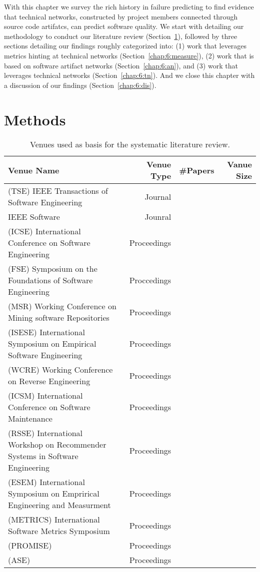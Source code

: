 \label{chap:tech-net}
With this chapter we survey the rich history in failure predicting to find evidence that technical networks, constructed by project members connected through source code artifatcs, can predict software quality.
We start with detailing our methodology to conduct our literature review (Section~\ref{chap:6:methods}), followed by three sections detailing our findings roughly categorized into: 
(1) work that leverages metrics hinting at technical networks (Section~\ref{chap:6:measure}),
(2) work that is based on software artifact networks (Section~\ref{chap:6:an}),
and (3) work that leverages technical networks (Section~\ref{chap:6:tn}).
And we close this chapter with a discussion of our findings (Section~\ref{chap:6:dis}).

\section{Methods}
\label{chap:6:methods}
\begin{table}[t]
\centering
\begin{tabular}{lrrr}
\toprule
Venue Name & Venue Type & #Papers & Vanue Size\\
\midrule
(TSE) IEEE Transactions of Software Engineering & Journal &\\
IEEE Software & Jounral & \\
(ICSE) International Conference on Software Engineering & Proceedings & \\
(FSE) Symposium on the Foundations of Software Engineering & Proccedings & \\
(MSR) Working Conference on Mining software Repositories & Proceedings & \\
(ISESE) International Symposium on Empirical Software Engineering & Proceedings & \\
(WCRE) Working Conference on Reverse Engineering & Proceedings & \\
(ICSM) International Conference on Software Maintenance & Proceedings & \\
(RSSE) International Workshop on Recommender Systems in Software Engineering & Proceedings & \\
(ESEM) International Symposium on Emprirical Engineering and Measurment & Proceedings & \\
(METRICS) International Software Metrics Symposium & Proceedings & \\
(PROMISE) & Proceedings & \\
(ASE) & Proceedings & \\
\bottomrule
\end{tabular}
\label{chap:6:tab:venues}
\caption{Venues used as basis for the systematic literature review.}
\end{table}

